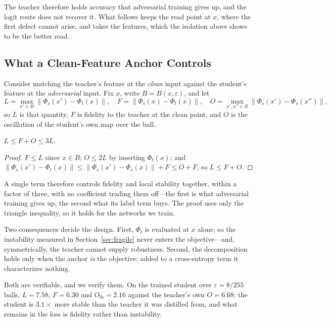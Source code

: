 The teacher therefore holds accuracy that adversarial training gives up, and the logit route does not
recover it. What follows keeps the read point at $x$, where the first defect cannot arise, and takes
the features, which the isolation above shows to be the better read.

\subsection{What a Clean-Feature Anchor Controls}
\label{sec:decomp}

Consider matching the teacher's feature at the \emph{clean} input against the student's feature at the
\emph{adversarial} input. Fix $x$, write $B=B(x,\varepsilon)$, and let
\begin{equation}
L=\max_{x'\in B}\lVert\Phi_s(x')-\Phi_t(x)\rVert,\quad
F=\lVert\Phi_s(x)-\Phi_t(x)\rVert,\quad
O=\max_{x',x''\in B}\lVert\Phi_s(x')-\Phi_s(x'')\rVert,
\label{eq:LFO}
\end{equation}
so $L$ is that quantity, $F$ is fidelity to the teacher at the clean point, and $O$ is the oscillation
of the student's own map over the ball.

\begin{proposition}
\label{prop:decomp}
$L\le F+O\le 3L$.
\end{proposition}

\begin{proof}
$F\le L$ since $x\in B$; $O\le 2L$ by inserting $\Phi_t(x)$; and
$\lVert\Phi_s(x')-\Phi_t(x)\rVert\le\lVert\Phi_s(x')-\Phi_s(x)\rVert+F\le O+F$, so $L\le F+O$.
\end{proof}

A single term therefore controls fidelity and local stability together, within a factor of three, with
no coefficient trading them off---the first is what adversarial training gives up, the second what its
label term buys. The proof uses only the triangle inequality, so it holds for the networks we train.

Two consequences decide the design. First, $\Phi_t$ is evaluated at $x$ alone, so the instability
measured in Section~\ref{sec:fragile} never enters the objective---and, symmetrically, the teacher
cannot supply robustness. Second, the decomposition holds only when the anchor \emph{is} the
objective: added to a cross-entropy term it characterizes nothing.

Both are verifiable, and we verify them. On the trained student over $\varepsilon=8/255$ balls,
$L=7.58$, $F=6.30$ and $O_{\mathrm{lb}}=2.16$ against the teacher's own $O=6.68$: the student is
$3.1\times$ more stable than the teacher it was distilled from, and what remains in the loss is
fidelity rather than instability.

